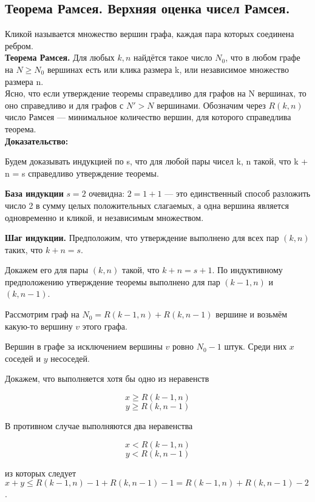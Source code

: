 \subsection{Теорема Рамсея. Верхняя оценка чисел Рамсея.}

Кликой называется множество вершин графа, каждая пара которых соединена ребром. \\

\textbf{Теорема Рамсея.} Для любых $k, n$ найдётся такое число $N_0$, что в любом графе на $N \geq N_0$ вершинах есть или клика размера k, или независимое множество размера n. \\

Ясно, что если утверждение теоремы справедливо для графов на N вершинах, то оно справедливо и для графов с $N' > N$ вершинами. Обозначим через $R(k,n)$ число Рамсея — минимальное количество вершин, для которого справедлива теорема. \\

\noindent \textbf{Доказательство:}

Будем доказывать индукцией по s, что для любой пары чисел k, n такой, что k + n = s справедливо утверждение теоремы.

\textbf{База индукции} $s = 2$ очевидна: $2 = 1 + 1$ — это единственный способ разложить число 2 в сумму целых положительных слагаемых, а одна вершина является одновременно и кликой, и независимым множеством.

\textbf{Шаг индукции.} Предположим, что утверждение выполнено для всех пар $(k, n)$ таких, что $k + n = s$.

Докажем его для пары $(k, n)$ такой, что $k + n = s + 1$. По индуктивному предположению утверждение теоремы выполнено для пар $(k - 1, n)$ и $(k, n - 1)$.

Рассмотрим граф на $N_0 = R(k - 1, n) + R(k, n - 1)$ вершине и возьмём какую-то вершину $v$ этого графа.

Вершин в графе за исключением вершины $v$ ровно $N_0 - 1$ штук. Среди них $x$ соседей и $y$ несоседей.

Докажем, что выполняется хотя бы одно из неравенств

$$x \geq R(k - 1, n)$$
$$y \geq R(k, n - 1)$$

В противном случае выполняются два неравенства

$$x < R(k - 1, n)$$
$$y < R(k, n - 1)$$

из которых следует $x+y \leq R(k - 1, n) - 1+R(k, n - 1) - 1 = R(k - 1, n)+R(k, n - 1) - 2$.

